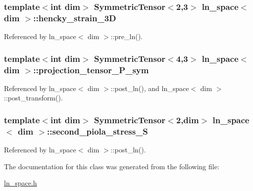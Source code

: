 \subsubsection[{\texorpdfstring{hencky\+\_\+strain\+\_\+3D}{hencky_strain_3D}}]{\setlength{\rightskip}{0pt plus 5cm}template$<$int dim$>$ Symmetric\+Tensor$<$2,3$>$ {\bf ln\+\_\+space}$<$ dim $>$\+::hencky\+\_\+strain\+\_\+3D}\hypertarget{classln__space_a867cb10924f94e01595a67fdd456ecd4}{}\label{classln__space_a867cb10924f94e01595a67fdd456ecd4}


Referenced by ln\+\_\+space$<$ dim $>$\+::pre\+\_\+ln().

\subsubsection[{\texorpdfstring{projection\+\_\+tensor\+\_\+\+P\+\_\+sym}{projection_tensor_P_sym}}]{\setlength{\rightskip}{0pt plus 5cm}template$<$int dim$>$ Symmetric\+Tensor$<$4,3$>$ {\bf ln\+\_\+space}$<$ dim $>$\+::projection\+\_\+tensor\+\_\+\+P\+\_\+sym\hspace{0.3cm}{\ttfamily [private]}}\hypertarget{classln__space_a514a44d8b96a0cffeab11d39933299b5}{}\label{classln__space_a514a44d8b96a0cffeab11d39933299b5}


Referenced by ln\+\_\+space$<$ dim $>$\+::post\+\_\+ln(), and ln\+\_\+space$<$ dim $>$\+::post\+\_\+transform().

\subsubsection[{\texorpdfstring{second\+\_\+piola\+\_\+stress\+\_\+S}{second_piola_stress_S}}]{\setlength{\rightskip}{0pt plus 5cm}template$<$int dim$>$ Symmetric\+Tensor$<$2,dim$>$ {\bf ln\+\_\+space}$<$ dim $>$\+::second\+\_\+piola\+\_\+stress\+\_\+S}\hypertarget{classln__space_a9827f6c10219014445a328c9972f89f7}{}\label{classln__space_a9827f6c10219014445a328c9972f89f7}


Referenced by ln\+\_\+space$<$ dim $>$\+::post\+\_\+ln().



The documentation for this class was generated from the following file\+:\begin{DoxyCompactItemize}
\item 
\hyperlink{ln__space_8h}{ln\+\_\+space.\+h}\end{DoxyCompactItemize}
